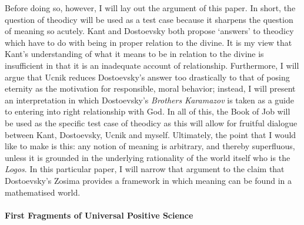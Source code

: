 \documentclass[12pt]{article}
\begin{document}
Before doing so, however, I will lay out the argument of this paper. In short, the question of theodicy will be used as a test case because it sharpens the question of meaning so acutely. Kant and Dostoevsky both propose `answers' to theodicy which have to do with being in proper relation to the divine. It is my view that Kant's understanding of what it means to be in relation to the divine is insufficient in that it is an inadequate account of relationship. Furthermore, I will argue that Ucnik reduces Dostoevsky's answer too drastically to that of posing eternity as the motivation for responsible, moral behavior; instead, I will present an interpretation in which Dostoevsky's \emph{Brothers Karamazov} is taken as a guide to entering into right relationship with God. In all of this, the Book of Job will be used as the specific test case of theodicy as this will allow for fruitful dialogue between Kant, Dostoevsky, Ucnik and myself. Ultimately, the point that I would like to make is this: any notion of meaning is arbitrary, and thereby superfluous, unless it is grounded in the underlying rationality of the world itself who is the \emph{Logos}. In this particular paper, I will narrow that argument to the claim that Dostoevsky's Zosima provides a framework in which meaning can be found in a mathematised world.

\paragraph*{First Fragments of Universal Positive Science}
\end{document}
